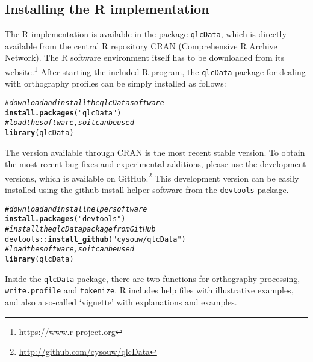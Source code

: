 \documentclass[output=inprep,
		biblatex
		]{LSP/langsci}\usepackage[]{graphicx}\usepackage[]{color}
\makeatletter
\newcommand{\hlstr}[1]{\textcolor[rgb]{0.192,0.494,0.8}{#1}}%
\newcommand{\hlcom}[1]{\textcolor[rgb]{0.678,0.584,0.686}{\textit{#1}}}%
\newcommand{\hlopt}[1]{\textcolor[rgb]{0,0,0}{#1}}%
\newcommand{\hlstd}[1]{\textcolor[rgb]{0.345,0.345,0.345}{#1}}%
\newcommand{\hlkwd}[1]{\textcolor[rgb]{0.737,0.353,0.396}{\textbf{#1}}}%
\newenvironment{kframe}{%
 \def\at@end@of@kframe{}%
 \ifinner\ifhmode%
  \def\at@end@of@kframe{\end{minipage}}%
  \begin{minipage}{\columnwidth}%
 \fi\fi%
 \def\FrameCommand##1{\hskip\@totalleftmargin \hskip-\fboxsep
 \colorbox{shadecolor}{##1}\hskip-\fboxsep
     \hskip-\linewidth \hskip-\@totalleftmargin \hskip\columnwidth}%
 \MakeFramed {\advance\hsize-\width
   \@totalleftmargin\z@ \linewidth\hsize
   \@setminipage}}%
 {\par\unskip\endMakeFramed%
 \at@end@of@kframe}
\newenvironment{knitrout}{}{} %
\makeatother
\begin{document}
\subsection*{Installing the R implementation}

The R implementation is available in the package \texttt{qlcData}, which is 
directly available from the central R repository CRAN (Comprehensive R Archive 
Network). The R software environment itself has to be downloaded from its 
website.\footnote{\url{https://www.r-project.org}} After starting the included 
R program, the \texttt{qlcData} package for dealing with orthography profiles can be 
simply installed as follows:

\begin{knitrout}\footnotesize
{}\color{fgcolor}\begin{kframe}
\begin{alltt}
\hlcom{# download and install the qlcData software}
\hlkwd{install.packages}\hlstd{(}\hlstr{"qlcData"}\hlstd{)}
\hlcom{# load the software, so it can be used}
\hlkwd{library}\hlstd{(qlcData)}
\end{alltt}
\end{kframe}
\end{knitrout}

\noindent The version available through CRAN is the most recent stable version.
To obtain the most recent bug-fixes and experimental additions, please use the
development versions, which is available on
GitHub.\footnote{\url{http://github.com/cysouw/qlcData}} This development
version can be easily installed using the github-install helper software from the
\texttt{devtools} package.

\begin{knitrout}\footnotesize
{}\color{fgcolor}\begin{kframe}
\begin{alltt}
\hlcom{# download and install helper software}
\hlkwd{install.packages}\hlstd{(}\hlstr{"devtools"}\hlstd{)}
\hlcom{# install the qlcData package from GitHub}
\hlstd{devtools}\hlopt{::}\hlkwd{install_github}\hlstd{(}\hlstr{"cysouw/qlcData"}\hlstd{)}
\hlcom{# load the software, so it can be used}
\hlkwd{library}\hlstd{(qlcData)}
\end{alltt}
\end{kframe}
\end{knitrout}

\noindent Inside the \texttt{qlcData} package, there are two functions for
orthography processing, \texttt{write.profile} and \texttt{tokenize}. R includes
help files with illustrative examples, and also a so-called `vignette' with
explanations and examples.
\end{document}
